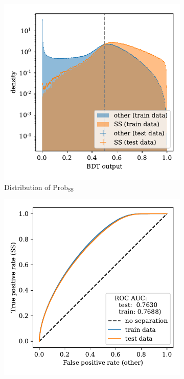 \begin{figure}
    \centering
    \begin{subfigure}{0.5\textwidth}
        \centering
        \includegraphics[width=\textwidth]{images/SS_output.pdf}
        \caption{Distribution of $\text{Prob}_\text{SS}$}
        \label{fig:SS_output}
    \end{subfigure}%
    \begin{subfigure}{0.5\textwidth}
        \centering
        \includegraphics[width=\textwidth]{images/SS_ROC.pdf}

\end{subfigure}
\end{figure}
